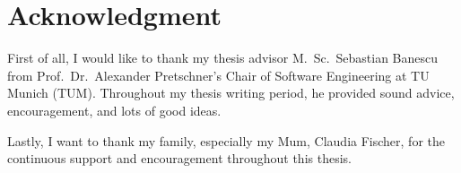 \newpage
\thispagestyle{empty}
\section*{Acknowledgment}
First of all, I would like to thank my thesis advisor M.~Sc.~Sebastian Banescu from Prof.~Dr.~Alexander Pretschner's Chair of Software Engineering at TU Munich (TUM). Throughout my thesis writing period, he provided sound advice, encouragement, and lots of good ideas.

\bigskip

Lastly, I want to thank my family, especially my Mum, Claudia Fischer, for the continuous support and encouragement throughout this thesis.
